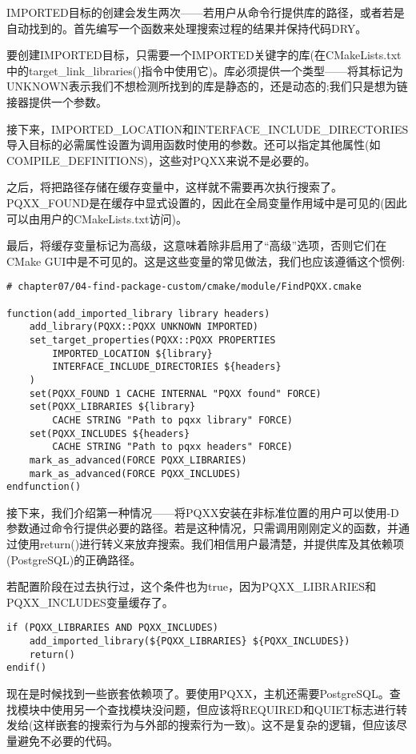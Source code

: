 IMPORTED目标的创建会发生两次——若用户从命令行提供库的路径，或者若是自动找到的。首先编写一个函数来处理搜索过程的结果并保持代码DRY。

要创建IMPORTED目标，只需要一个IMPORTED关键字的库(在CMakeLists.txt中的target\_link\_libraries()指令中使用它)。库必须提供一个类型——将其标记为UNKNOWN表示我们不想检测所找到的库是静态的，还是动态的;我们只是想为链接器提供一个参数。

接下来，IMPORTED\_LOCATION和INTERFACE\_INCLUDE\_DIRECTORIES导入目标的必需属性设置为调用函数时使用的参数。还可以指定其他属性(如COMPILE\_DEFINITIONS)，这些对PQXX来说不是必要的。

之后，将把路径存储在缓存变量中，这样就不需要再次执行搜索了。PQXX\_FOUND是在缓存中显式设置的，因此在全局变量作用域中是可见的(因此可以由用户的CMakeLists.txt访问)。

最后，将缓存变量标记为高级，这意味着除非启用了“高级”选项，否则它们在CMake GUI中是不可见的。这是这些变量的常见做法，我们也应该遵循这个惯例:

\begin{lstlisting}[style=styleCMake]
# chapter07/04-find-package-custom/cmake/module/FindPQXX.cmake

function(add_imported_library library headers)
	add_library(PQXX::PQXX UNKNOWN IMPORTED)
	set_target_properties(PQXX::PQXX PROPERTIES
		IMPORTED_LOCATION ${library}
		INTERFACE_INCLUDE_DIRECTORIES ${headers}
	)
	set(PQXX_FOUND 1 CACHE INTERNAL "PQXX found" FORCE)
	set(PQXX_LIBRARIES ${library}
		CACHE STRING "Path to pqxx library" FORCE)
	set(PQXX_INCLUDES ${headers}
		CACHE STRING "Path to pqxx headers" FORCE)
	mark_as_advanced(FORCE PQXX_LIBRARIES)
	mark_as_advanced(FORCE PQXX_INCLUDES)
endfunction()
\end{lstlisting}

接下来，我们介绍第一种情况——将PQXX安装在非标准位置的用户可以使用-D参数通过命令行提供必要的路径。若是这种情况，只需调用刚刚定义的函数，并通过使用return()进行转义来放弃搜索。我们相信用户最清楚，并提供库及其依赖项(PostgreSQL)的正确路径。

若配置阶段在过去执行过，这个条件也为true，因为PQXX\_LIBRARIES和PQXX\_INCLUDES变量缓存了。

\begin{lstlisting}[style=styleCMake]
if (PQXX_LIBRARIES AND PQXX_INCLUDES)
	add_imported_library(${PQXX_LIBRARIES} ${PQXX_INCLUDES})
	return()
endif()
\end{lstlisting}

现在是时候找到一些嵌套依赖项了。要使用PQXX，主机还需要PostgreSQL。查找模块中使用另一个查找模块没问题，但应该将REQUIRED和QUIET标志进行转发给(这样嵌套的搜索行为与外部的搜索行为一致)。这不是复杂的逻辑，但应该尽量避免不必要的代码。

